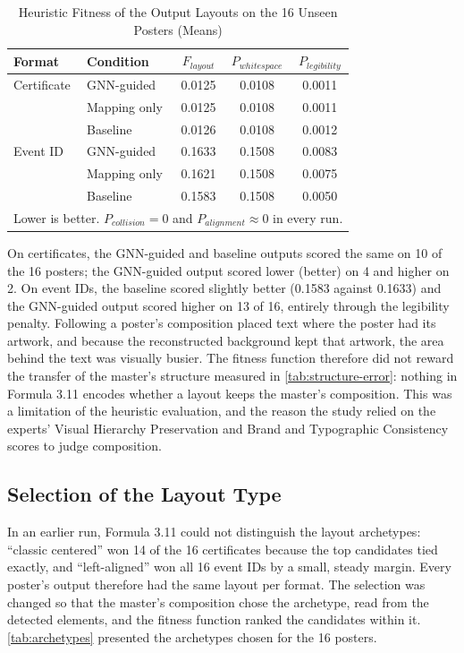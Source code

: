 \begin{refsection}
\begin{table}[ht]
\centering
\caption{Heuristic Fitness of the Output Layouts on the 16 Unseen Posters (Means)}
\label{tab:fitness}
\small
\begin{tabular}{l l c c c}
\hline
\textbf{Format} & \textbf{Condition} & \textbf{$F_{layout}$} & \textbf{$P_{whitespace}$} & \textbf{$P_{legibility}$} \\ \hline
Certificate & GNN-guided & 0.0125 & 0.0108 & 0.0011 \\
 & Mapping only & 0.0125 & 0.0108 & 0.0011 \\
 & Baseline & 0.0126 & 0.0108 & 0.0012 \\ \hline
Event ID & GNN-guided & 0.1633 & 0.1508 & 0.0083 \\
 & Mapping only & 0.1621 & 0.1508 & 0.0075 \\
 & Baseline & 0.1583 & 0.1508 & 0.0050 \\ \hline
\multicolumn{5}{p{0.80\textwidth}}{\footnotesize Lower is better. $P_{collision} = 0$ and $P_{alignment} \approx 0$ in every run.}
\end{tabular}
\end{table}

On certificates, the GNN-guided and baseline outputs scored the same on 10 of the 16 posters; the GNN-guided output scored lower (better) on 4 and higher on 2. On event IDs, the baseline scored slightly better (0.1583 against 0.1633) and the GNN-guided output scored higher on 13 of 16, entirely through the legibility penalty. Following a poster's composition placed text where the poster had its artwork, and because the reconstructed background kept that artwork, the area behind the text was visually busier. The fitness function therefore did not reward the transfer of the master's structure measured in \ref{tab:structure-error}: nothing in Formula 3.11 encodes whether a layout keeps the master's composition. This was a limitation of the heuristic evaluation, and the reason the study relied on the experts' Visual Hierarchy Preservation and Brand and Typographic Consistency scores to judge composition.

\subsection{Selection of the Layout Type}

In an earlier run, Formula 3.11 could not distinguish the layout archetypes: ``classic centered'' won 14 of the 16 certificates because the top candidates tied exactly, and ``left-aligned'' won all 16 event IDs by a small, steady margin. Every poster's output therefore had the same layout per format. The selection was changed so that the master's composition chose the archetype, read from the detected elements, and the fitness function ranked the candidates within it. \ref{tab:archetypes} presented the archetypes chosen for the 16 posters.


\end{refsection}

